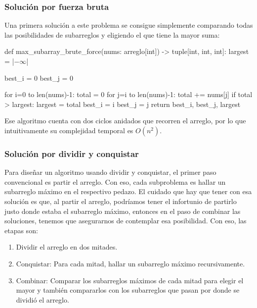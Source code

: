 \subsubsection{Solución por fuerza bruta}

Una primera solución a este problema se consigue simplemente comparando todas las posibilidades de subarreglos y eligiendo el que tiene la mayor suma:
\begin{pseudocode}
def max_subarray_brute_force(nums: arreglo[int]) -> tuple[int, int, int]:
    largest = |$-\infty$|

    best_i = 0
    best_j = 0

    for i=0 to len(nums)-1:
        total = 0
        for j=i to len(nums)-1:
            total += nums[j]
            if total > largest:
                largest = total
                best_i = i
                best_j = j
    return best_i, best_j, largest
\end{pseudocode}
Ese algoritmo cuenta con dos ciclos anidados que recorren el arreglo, por lo que intuitivamente su complejidad temporal es $O(n^2)$.

\subsubsection{Solución por dividir y conquistar}
Para diseñar un algoritmo usando dividir y conquistar, el primer paso convencional es partir el arreglo. Con eso, cada subproblema es hallar un subarreglo máximo en el respectivo pedazo. El cuidado que hay que tener con esa solución es que, al partir el arreglo, podríamos tener el infortunio de partirlo justo donde estaba el subarreglo máximo, entonces en el paso de combinar las soluciones, tenemos que asegurarnos de contemplar esa posibilidad. Con eso, las etapas son:
\begin{enumerate}
    \item Dividir el arreglo en dos mitades.
    \item Conquistar: Para cada mitad, hallar un subarreglo máximo recursivamente.
    \item Combinar: Comparar los subarreglos máximos de cada mitad para elegir el mayor y también compararlos con los subarreglos que pasan por donde se dividió el arreglo.
\end{enumerate}


